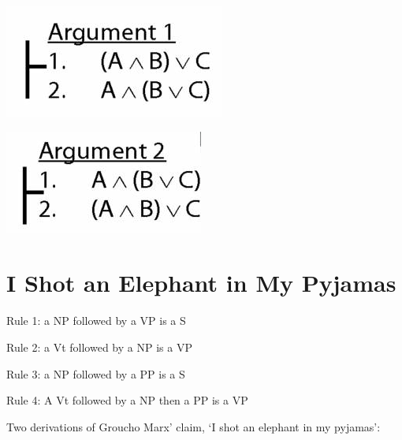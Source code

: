 \documentclass[12pt]{extarticle}
\begin{document}
\begin{multicols*}{3}
\begin{center}
\includegraphics[scale=0.3]{img/arg1_unit_153.png}
\end{center}
\begin{center}
\includegraphics[scale=0.3]{img/arg2_unit_153.png}
\end{center}
 
 
\section{I Shot an Elephant in My Pyjamas}
 
Rule 1: a NP followed by a VP is a S
 
Rule 2: a Vt followed by a NP is a VP
 
Rule 3: a NP followed by a PP is a S
 
Rule 4: A Vt followed by a NP then a PP is a VP
 
Two derivations of Groucho Marx’ claim, ‘I shot an elephant in my pyjamas':
 

\end{multicols*}
\end{document}
